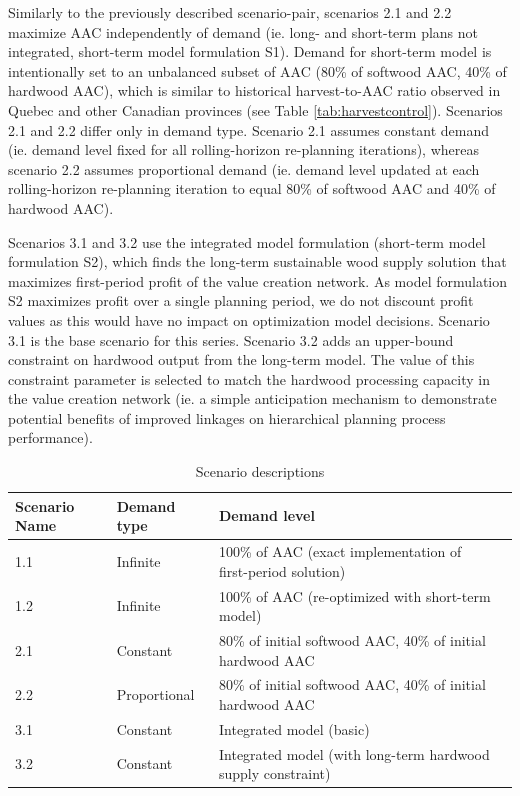 Similarly to the previously described scenario-pair, scenarios 2.1 and
2.2 maximize AAC independently of demand (ie. long- and short-term
plans not integrated, short-term model formulation S1). Demand for
short-term model is intentionally set to an unbalanced subset of AAC
(80\% of softwood AAC, 40\% of hardwood AAC), which is similar to
historical harvest-to-AAC ratio observed in Quebec and other Canadian
provinces (see Table \ref{tab:harvestcontrol}). Scenarios 2.1 and 2.2
differ only in demand type. Scenario 2.1 assumes constant demand
(ie. demand level fixed for all rolling-horizon re-planning
iterations), whereas scenario 2.2 assumes proportional demand
(ie. demand level updated at each rolling-horizon re-planning
iteration to equal 80\% of softwood AAC and 40\% of hardwood AAC).

Scenarios 3.1 and 3.2 use the integrated model formulation (short-term
model formulation S2), which finds the long-term sustainable wood
supply solution that maximizes first-period profit of the value
creation network. As model formulation S2 maximizes profit over a
single planning period, we do not discount profit values as this would
have no impact on optimization model decisions. Scenario 3.1 is the
base scenario for this series. Scenario 3.2 adds an upper-bound
constraint on hardwood output from the long-term model. The value of this
constraint parameter is selected to match the hardwood processing capacity
in the value creation network (ie. a simple anticipation mechanism to
demonstrate potential benefits of improved linkages on hierarchical
planning process performance).

\begin{table}
\caption{Scenario descriptions}
\label{tab:scenarios1}
\renewcommand{\tabcolsep}{2pt}
\begin{tabular}{llll}
\toprule 
Scenario Name & Demand type & Demand level\tabularnewline
\midrule
1.1 & Infinite & 100\% of AAC (exact implementation of first-period solution)\tabularnewline
1.2 & Infinite & 100\% of AAC (re-optimized with short-term model)\tabularnewline
2.1 & Constant & 80\% of initial softwood AAC, 40\% of initial hardwood AAC\tabularnewline
2.2 & Proportional & 80\% of initial softwood AAC, 40\% of initial hardwood AAC\tabularnewline
3.1 & Constant & Integrated model (basic)\tabularnewline
3.2 & Constant & Integrated model (with long-term hardwood supply constraint) \tabularnewline
\bottomrule
\end{tabular}
\end{table}


